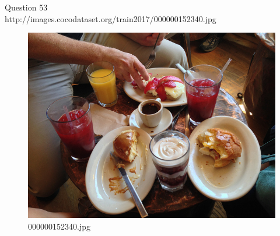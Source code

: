 Question 53\\
http://images.cocodataset.org/train2017/000000152340.jpg
\begin{figure}[h]
    \centering
    \includegraphics[width=0.8\linewidth]{../image set/hard/000000152340.jpg}
    \caption{000000152340.jpg}
\end{figure}

